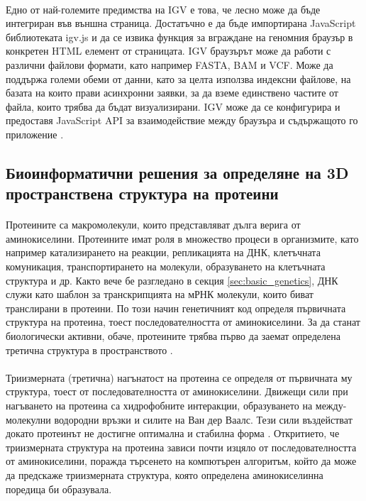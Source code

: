 \documentclass[pdftex,cyrillic,14pt,a4page,twoside,openright]{extreport}
\begin{document}
\paragraph{}
Едно от най-големите предимства на IGV е това, че лесно може да бъде интегриран във външна страница. Достатъчно е да бъде импортирана JavaScript библиотеката igv.js и да се извика функция за вграждане на геномния браузър в конкретен HTML елемент от страницата. IGV браузърът може да работи с различни файлови формати, като например FASTA, BAM и VCF. Може да поддържа големи обеми от данни, като за целта използва индексни файлове, на базата на които прави асинхронни заявки, за да вземе единствено частите от файла, които трябва да бъдат визуализирани. IGV може да се конфигурира и предоставя JavaScript API за взаимодействие между браузъра и съдържащото го приложение \cite{robinson2020}.

\subsection{Биоинформатични решения за определяне на 3D пространствена структура на протеини}
\paragraph{}
Протеините са макромолекули, които представляват дълга верига от аминокиселини. Протеините имат роля в множество процеси в организмите, като например катализирането на реакции, репликацията на ДНК, клетъчната комуникация, транспортирането на молекули, образуването на клетъчната структура и др. Както вече бе разгледано в секция \ref{sec:basic_genetics}, ДНК служи като шаблон за транскрипцията на мРНК молекули, които биват транслирани в протеини. По този начин генетичният код определя първичната структура на протеина, тоест последователността от аминокиселини. За да станат биологически активни, обаче, протеините трябва първо да заемат определена третична структура в пространството \cite{creighton1990protein}.

\paragraph{}
Триизмерната (третична) нагънатост на протеина се определя от първичната му структура, тоест от последователността от аминокиселини. Движещи сили при нагъването на протеина са хидрофобните интеракции, образуването на между-молекулни водородни връзки и силите на Ван дер Ваалс. Тези сили въздействат докато протеинът не достигне оптимална и стабилна форма \cite{dill2008}. Откритието, че триизмерната структура на протеина зависи почти изцяло от последователността от аминокиселини, поражда търсенето на компютърен алгоритъм, който да може да предскаже триизмерната структура, която определена аминокиселинна поредица би образувала.
\end{document}
